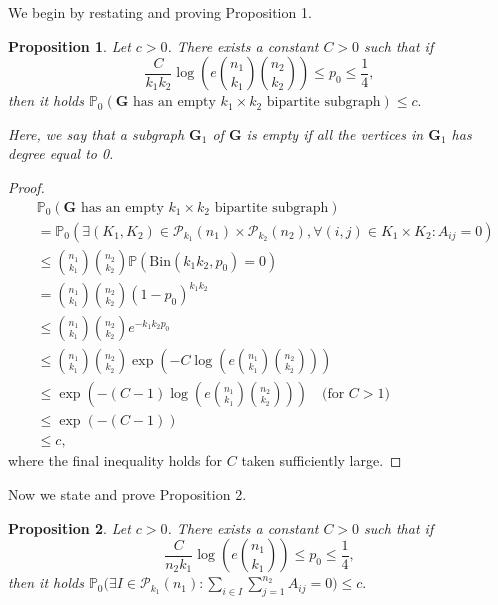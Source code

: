 \documentclass{article}
\newcommand{\bG}{\mathbf{G}}
\newcommand{\bbP}{\mathbb{P}}
\newtheorem{proposition}{Proposition}
\begin{document}
We begin by restating and proving Proposition 1. 
\begin{proposition}
    Let $c > 0$. There exists a constant $C > 0$ such that if
    \[\frac{C}{k_1k_2} \log\left(e{n_1 \choose k_1}{n_2 \choose k_2}\right) \leq p_0 \leq \frac{1}{4},\]
    then it holds
    \(\bbP_0\left(\text{$\bG$ has an empty $k_1 \times k_2$ bipartite subgraph}\right) \leq c.\)
    
    Here, we say that a subgraph $\bG_1$ of $\bG$ is empty if all the vertices in $\bG_1$ has degree equal to 0.
\end{proposition}
\begin{proof}
\begin{align*}
    &\bbP_0\left(\text{$\bG$ has an empty $k_1 \times k_2$ bipartite subgraph}\right) \\ 
    &= \mathbb P_0\left(\exists (K_1,K_2) \in \mathcal{P}_{k_1}(n_1) \times \mathcal{P}_{k_2}(n_2), \forall (i,j) \in K_1 \times K_2: A_{ij} = 0\right) \\
    &\leq {n_1 \choose k_1} {n_2 \choose k_2}\bbP\left(\text{Bin}(k_1k_2, p_0) = 0\right) \\
    &=  {n_1 \choose k_1} {n_2 \choose k_2}(1 - p_0)^{k_1k_2} \\
    &\leq {n_1 \choose k_1} {n_2 \choose k_2} e^{-k_1k_2 p_0} \\
    &\leq {n_1 \choose k_1} {n_2 \choose k_2}\exp \left(-C\log\left(e{n_1 \choose k_1}{n_2 \choose k_2}\right)\right) \\
    &\leq \exp \left(-(C - 1)\log\left(e{n_1 \choose k_1}{n_2 \choose k_2}\right)\right) \quad \text{(for $C > 1$)} \\
    &\leq \exp\left(-(C - 1)\right) \\
    &\leq c,
\end{align*}
where the final inequality holds for $C$ taken sufficiently large.
\end{proof}
Now we state and prove Proposition 2. 
\begin{proposition}
    Let $c > 0$. There exists a constant $C > 0$ such that if
    \[\frac{C}{n_2k_1} \log\left(e{n_1 \choose k_1}\right) \leq p_0 \leq \frac{1}{4},\]
    then it holds
    \(\bbP_0\Big(\exists I \in \mathcal{P}_{k_1}(n_1): \sum_{i \in I} \sum_{j=1}^{n_2} A_{ij} = 0\Big) \leq c.\)
\end{proposition}
\end{document}

